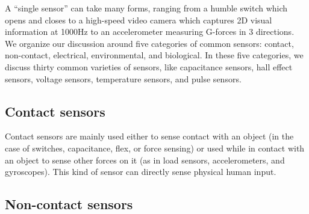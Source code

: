  A ``single sensor'' can take many forms, ranging from a humble switch which opens and closes to a high-speed video camera which captures 2D visual information at 1000Hz to an accelerometer measuring G-forces in 3 directions.
We organize our discussion around five categories of common sensors: contact, non-contact, electrical, environmental, and biological. In these five categories, we discuss thirty common varieties of sensors, like capacitance sensors, hall effect sensors, voltage sensors, temperature sensors, and pulse sensors.



\subsection{Contact sensors}

Contact sensors are mainly used either to sense contact with an object (in the case of switches, capacitance, flex, or force sensing) or used while in contact with an object to sense other forces on it (as in load sensors, accelerometers, and gyroscopes). This kind of sensor can directly sense physical human input.

\subsection{Non-contact sensors}


